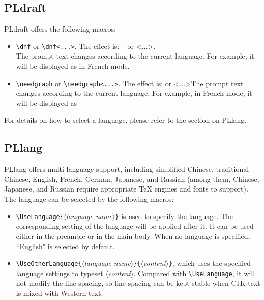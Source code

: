 \documentclass[allowbf]{lebhart}
\providecommand{\meta}[1]{$\langle${\normalfont\itshape#1}$\rangle$}
\providecommand{\PLdraft}{\textsf{PLdraft}}
\providecommand{\PLlang}{\textsf{PLlang}}
\begin{document}
\subsection{PLdraft}

\PLdraft{} offers the following macros:
\begin{itemize}
    \item \lstinline|\dnf| or \lstinline|\dnf<...>|. The effect is: \dnf~ or \dnf<...>. \\The prompt text changes according to the current language. For example, it will be displayed as  in French mode.
    \item \lstinline|\needgraph| or \lstinline|\needgraph<...>|. The effect is: \needgraph or \needgraph<...>The prompt text changes according to the current language. For example, in French mode, it will be displayed as 
\end{itemize}

For details on how to select a language, please refer to the section on \PLlang{}.

\subsection{PLlang}

\PLlang{} offers multi-language support, including simplified Chinese, traditional Chinese, English, French, German, Japanese, and Russian (among them, Chinese, Japanese, and Russian require appropriate \TeX{} engines and fonts to support). The language can be selected by the following macros:

\begin{itemize}
    \item \lstinline|\UseLanguage{|\meta{language name}\lstinline|}| is used to specify the language. The corresponding setting of the language will be applied after it. It can be used either in the preamble or in the main body. When no language is specified, ``English" is selected by default.
    \item \lstinline|\UseOtherLanguage{|\meta{language name}\lstinline|}{|\meta{content}\lstinline|}|, which uses the specified language settings to typeset \meta{content}. Compared with \lstinline|\UseLanguage|, it will not modify the line spacing, so line spacing can be kept stable when CJK text is mixed with Western text.
\end{itemize}
\end{document}
